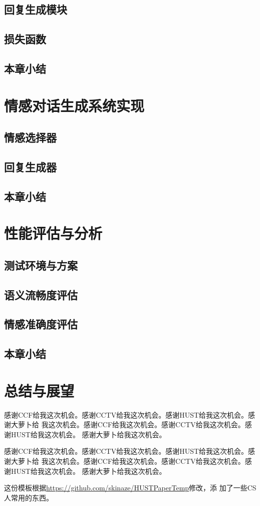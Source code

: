 \documentclass[supercite]{HustGraduPaper}
\theoremstyle{definition}
\begin{document}
\subsection{回复生成模块}
\subsection{损失函数}
\subsection{本章小结}
\section{情感对话生成系统实现}
\subsection{情感选择器}
\subsection{回复生成器}
\subsection{本章小结}
\section{性能评估与分析}
\subsection{测试环境与方案}
\subsection{语义流畅度评估}
\subsection{情感准确度评估}
\subsection{本章小结}
\section{总结与展望}

\begin{thankpage}

感谢CCF给我这次机会。感谢CCTV给我这次机会。感谢HUST给我这次机会。感谢大萝卜给
我这次机会。感谢CCF给我这次机会。感谢CCTV给我这次机会。感谢HUST给我这次机会。
感谢大萝卜给我这次机会。

感谢CCF给我这次机会。感谢CCTV给我这次机会。感谢HUST给我这次机会。感谢大萝卜给
我这次机会。感谢CCF给我这次机会。感谢CCTV给我这次机会。感谢HUST给我这次机会。
感谢大萝卜给我这次机会。

这份模板根据\url{https://github.com/skinaze/HUSTPaperTemp}\cite{ski17}修改，添
加了一些CS人常用的东西。


\end{thankpage}

\nocite{*}


\end{document}
